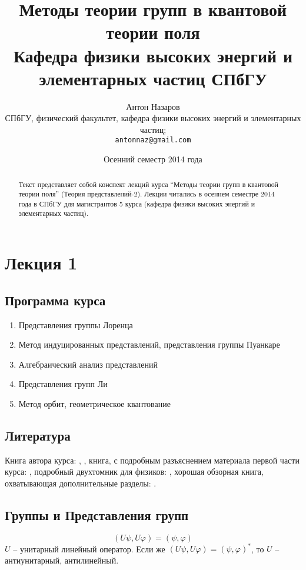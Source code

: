 \documentclass[a4paper,12pt]{article}
\title{Методы теории групп в квантовой теории поля\\
\small{Кафедра физики высоких энергий и элементарных частиц СПбГУ}
}
\author{Антон Назаров\\
  \small{СПбГУ, физический факультет, кафедра физики высоких энергий и элементарных частиц;}\\
  \texttt{antonnaz@gmail.com}
}
\date{Осенний семестр 2014 года}
\theoremstyle{definition}
\theoremstyle{definition}
\theoremstyle{definition}
\theoremstyle{definition}
\begin{document}
\maketitle
\thispagestyle{empty}
\begin{abstract}
  Текст представляет собой конспект лекций курса ``Методы теории групп в квантовой теории поля'' (Теория представлений-2). Лекции читались в осеннем семестре 2014 года в СПбГУ для магистрантов 5 курса (кафедра физики высоких энергий и элементарных частиц). 
\end{abstract}
\tableofcontents

\section{Лекция 1}
\label{sec:lecture-1}

\subsection{Программа курса}
\label{sec:program}
\begin{enumerate}
\item Представления группы Лоренца
\item Метод индуцированных представлений, представления группы Пуанкаре
\item Алгебраический анализ представлений
\item Представления групп Ли
\item Метод орбит, геометрическое квантование
\end{enumerate}

\subsection{Литература}

{}


Книга автора курса: \cite{book:10358}, \cite{book:1244385}, книга, с подробным разъяснением
материала первой части курса: \cite{book:855864}, подробный двухтомник для физиков:
\cite{book:130300,book:130301}, хорошая обзорная книга, охватывающая дополнительные разделы:
\cite{book:872634}.

\subsection{Группы и Представления групп}
\label{sec:intro}

\begin{equation}
  \label{eq:1}
  (U\psi,U\varphi)=(\psi,\varphi)
\end{equation}
$U$ -- унитарный линейный оператор. Если же $ (U\psi,U\varphi)=(\psi,\varphi)^{*}$, то $U$ --
антиунитарный, антилинейный.
\end{document}
